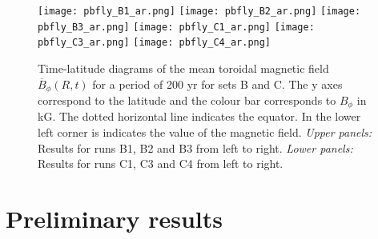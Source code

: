 \documentclass[baaa]{baaa}
\begin{document}
\begin{figure*}[t!]
    \centering
    \texttt{[image: pbfly\_B1\_ar.png]}
    \texttt{[image: pbfly\_B2\_ar.png]}
    \texttt{[image: pbfly\_B3\_ar.png]}
    \texttt{[image: pbfly\_C1\_ar.png]}
    \texttt{[image: pbfly\_C3\_ar.png]}
    \texttt{[image: pbfly\_C4\_ar.png]}
    \caption{Time-latitude diagrams of the mean toroidal magnetic field $\overline{B}_{\phi}(R, t)$ for a period of 200 yr for sets B and C. The y axes correspond to the latitude and the colour bar corresponds to $B_{\phi}$ in kG. The dotted horizontal line indicates the equator. In the lower left corner is indicates the value of the magnetic field. \emph{Upper panels:} Results for runs B1, B2 and B3 from left to right. \emph{Lower panels:} Results for runs C1, C3 and C4 from left to right.}
    \label{pbfly}
\end{figure*}


\section{Preliminary results}\label{S_results}
\end{document}
